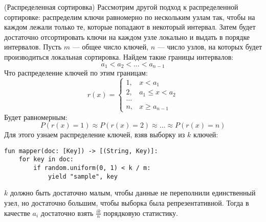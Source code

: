\begin{algorithm}(Распределенная сортировка)
  \newline
  Рассмотрим другой подход к распределенной сортировке: распределим ключи
  равномерно по нескольким узлам так, чтобы на каждом лежали только те, которые
  попадают в некоторый интервал. Затем будет достаточно отсортировать ключи на
  каждом узле локально и выдать в порядке интервалов.
  \newline
  \newline
  Пусть $m$ --- общее число ключей, $n$ --- число узлов, на которых будет
  производиться локальная сортировка. Найдем такие границы интервалов:
  $$a_1 < a_2 < \ldots < a_{n - 1}$$
  Что распределение ключей по этим границам:
  $$r(x) =
    \begin{cases}
      1, & x < a_1 \\
      2, & a_1 \leq x < a_2 \\
      \ldots \\
      n, & x \geq a_{n - 1}
    \end{cases}$$
  Будет равномерным:
  $$P(r(x) = 1) \approx P(r(x) = 2) \approx \ldots \approx P(r(x) = n)$$
  Для этого узнаем распределение ключей, взяв выборку из $k$ ключей:
  \begin{lstlisting}
fun mapper(doc: [Key]) -> [(String, Key)]:
    for key in doc:
        if random.uniform(0, 1) < k / m:
            yield "sample", key
  \end{lstlisting}
  $k$ должно быть достаточно малым, чтобы данные не переполнили единственный
  узел, но достаточно большим, чтобы выборка была репрезентативной. Тогда в
  качестве $a_i$ достаточно взять $\frac{ik}{n}$ порядковую статистику.
\end{algorithm}

